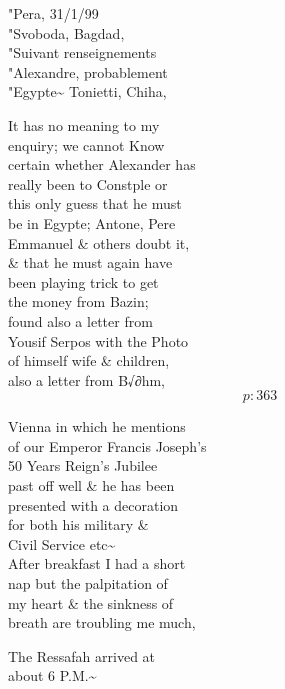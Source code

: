 \documentclass{report}
\begin{document}
	\par{
 	"Pera, 31/1/99\ \\"Svoboda, Bagdad,\ \\"Suivant renseignements\ \\"Alexandre, probablement\ \\"Egypte\~{} Tonietti, Chiha,\ \\
	}

	\par{
 	It has no meaning to my\ \\enquiry; we cannot Know\ \\certain whether Alexander has\ \\really been to Constple or\ \\this only guess that he must\ \\be in Egypte; Antone, Pere\ \\Emmanuel \& others doubt it,\ \\\& that he must again have\ \\been playing trick to get\ \\the money from Bazin;\ \\found also a letter from\ \\Yousif Serpos with the Photo\ \\of himself wife \& children,\ \\also a letter from B√∂hm,\ \\
  \[p: 363 \]

	}


	\par{
 	Vienna in which he mentions\ \\of our Emperor Francis Joseph’s\ \\50 Years Reign’s Jubilee\ \\past off well \& he has been\ \\presented with a decoration\ \\for both his military \&\ \\Civil Service etc\~{}\ \\After breakfast I had a short\ \\nap but the palpitation of\ \\my heart \& the sinkness of\ \\breath are troubling me much,\ \\
	}

	\par{
 	The Ressafah arrived at\ \\about 6 P.M.\~{}\ \\
	}
\end{document}
